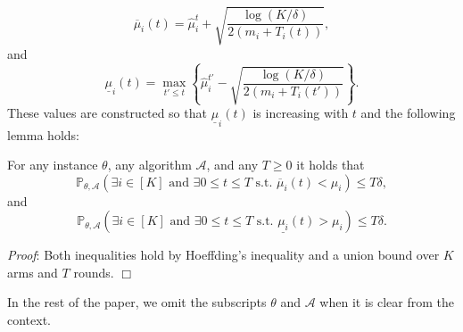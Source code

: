 \[
\overline{\mu}_i(t)=\hat{\mu}_i^t+\sqrt{\frac{\log(K/\delta)}{2(m_i+T_i(t))}},
\]
and 
\[
\underline{\mu}_i(t)=\max_{t'\leq t} \left\{\hat{\mu}_i^{t'}-\sqrt{\frac{\log(K/\delta)}{2(m_i+T_i(t'))}}\right\}.
\]
These values are constructed so that $\underline{\mu}_i(t)$ is increasing with $t$ and the following lemma holds:
\begin{lemma}\label{lem:hoeff}
    For any instance $\theta$, any algorithm $\mathcal{A}$, and any $T\geq0$ it holds that
    \[
    \mathbb{P}_{\theta,\mathcal{A}}\left(\exists i \in [K] \text{ and } \exists 0\leq t\leq T \text{ s.t. } \overline{\mu}_i(t)<\mu_i\right)\leq T\delta,
    \]
    and
     \[
    \mathbb{P}_{\theta,\mathcal{A}}\left(\exists i \in [K]\text{ and } \exists 0\leq t\leq T \text{ s.t. } \underline{\mu_i}(t)>\mu_i\right)\leq T\delta.
    \]
\end{lemma}

\textit{Proof}: Both inequalities hold by Hoeffding's inequality \citep{Vershynin_2018} and a union bound over  $K$ arms and $T$ rounds. \hfill \(\Box\)

In the rest of the paper, we omit the subscripts $\theta$ and $\mathcal{A}$ when it is clear from the context.